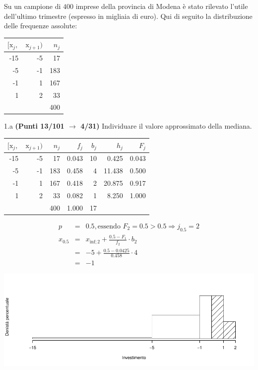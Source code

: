 \documentclass[
  11pt,
]{book}
\theoremstyle{mytheoremstyle}
\theoremstyle{mydefstyle}
\newenvironment{sol}
  {
  \begin{tcolorbox}[enhanced,breakable,arc=0.1mm,boxrule=1pt,colback=white,colframe=iblue,
  title=\bf \fontfamily{lmss}\selectfont \hspace{.5 cm} Soluzione,drop fuzzy shadow]

}{
\end{tcolorbox}
  }
\begin{document}
Su un campione di \(400\) imprese della provincia di Modena è stato rilevato l'utile dell'ultimo trimestre (espresso in migliaia di euro). Qui di seguito la distribuzione delle frequenze assolute:

\begin{table}[H]
\centering
\begin{tabular}{rrr}
\toprule
$[\text{x}_j,$ & $\text{x}_{j+1})$ & $n_j$\\
\midrule
-15 & -5 & 17\\
-5 & -1 & 183\\
-1 & 1 & 167\\
1 & 2 & 33\\
 &  & 400\\
\bottomrule
\end{tabular}
\end{table}

1.a \textbf{(Punti 13/101 \(\rightarrow\) 4/31)} Individuare il valore approssimato della mediana.

\begin{sol}

\begin{table}[H]
\centering
\begin{tabular}{rrrrrrr}
\toprule
$[\text{x}_j,$ & $\text{x}_{j+1})$ & $n_j$ & $f_j$ & $b_j$ & $h_j$ & $F_j$\\
\midrule
-15 & -5 & 17 & 0.043 & 10 & 0.425 & 0.043\\
-5 & -1 & 183 & 0.458 & 4 & 11.438 & 0.500\\
-1 & 1 & 167 & 0.418 & 2 & 20.875 & 0.917\\
1 & 2 & 33 & 0.082 & 1 & 8.250 & 1.000\\
 &  & 400 & 1.000 & 17 &  & \\
\bottomrule
\end{tabular}
\end{table}

\begin{eqnarray*}
  p &=&  0.5 , \text{essendo }F_{ 2 }= 0.5  > 0.5  \Rightarrow j_{ 0.5 }= 2 \\
  x_{ 0.5 } &=& x_{\text{inf}; 2 } + \frac{ { 0.5 } - F_{ 1 }} {f_{ 2 }} \cdot b_{ 2 } \\
            &=&  -5  + \frac {{ 0.5 } -  0.0425 } { 0.458 } \cdot  4  \\
            &=&  -1 
\end{eqnarray*}

\begin{center}\includegraphics{Esami_passati_con_soluzioni_files/figure-latex/2023-20,-1} \end{center}

\end{sol}
\end{document}
